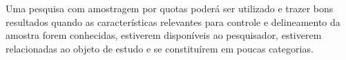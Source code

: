 Uma pesquisa com amostragem por quotas poderá ser utilizado e trazer bons resultados quando as características relevantes para controle e delineamento da amostra forem conhecidas, estiverem disponíveis ao pesquisador, estiverem relacionadas ao objeto de estudo e se constituírem em poucas categorias.
